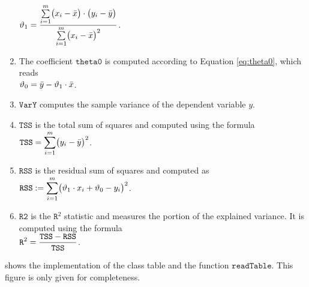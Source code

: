 \begin{enumerate}
      \hspace*{1.3cm}
      $\displaystyle\vartheta_1 = \frac{\sum\limits_{i=1}^m \bigl(x_i - \bar{x}\bigr) \cdot \bigl(y_i - \bar{y}\bigr)}{
                        \sum\limits_{i=1}^m \bigl(x_i - \bar{x}\bigr)^2}  
      $.
\item The coefficient $\mathtt{theta0}$ is computed according to Equation \ref{eq:theta0}, which reads
      \\[0.2cm]
      \hspace*{1.3cm}
      $\displaystyle\vartheta_0 = \bar{y} - \vartheta_1 \cdot \bar{x}$.
\item $\mathtt{VarY}$ computes the sample variance of the dependent variable $y$.
\item $\mathtt{TSS}$ is the total sum of squares and computed using the formula
      \\[0.2cm]
      \hspace*{1.3cm}
      $\displaystyle\mathtt{TSS} = \sum\limits_{i=1}^m \bigl(y_i - \bar{y}\bigr)^2$.
\item $\mathtt{RSS}$ is the residual sum of squares and computed as
      \\[0.2cm]
      \hspace*{1.3cm}
      $\displaystyle\mathtt{RSS} := \sum\limits_{i=1}^m \bigl(\vartheta_1 \cdot x_i + \vartheta_0 - y_i\bigr)^2$.
\item $\mathtt{R2}$ is the $\mathtt{R}^2$ statistic and measures the portion of the explained variance.
      It is computed using the formula
      \\[0.2cm]
      \hspace*{1.3cm}
      $\displaystyle \mathtt{R}^2 = \frac{\mathtt{TSS} - \mathtt{RSS}}{\mathtt{TSS}}$.
\end{enumerate}
 shows the implementation of the class table and the function $\mathtt{readTable}$.  This figure is
only given for completeness.

